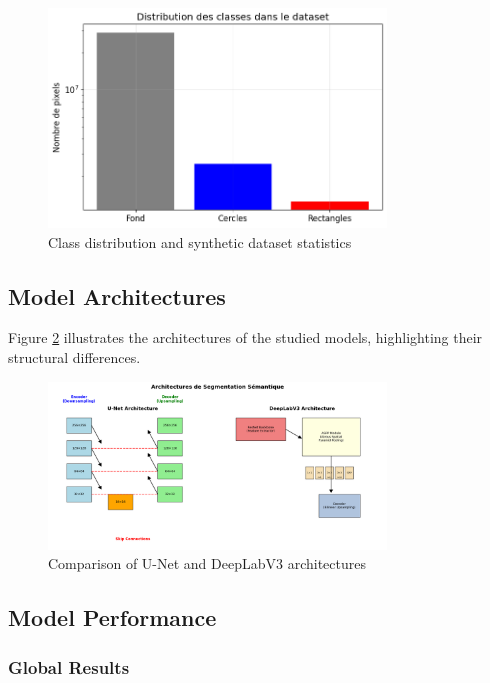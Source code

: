 \documentclass[12pt,a4paper]{article}
\begin{document}
\begin{figure}[H]
    \centering
    \includegraphics[width=0.8\textwidth]{img_tp1/cell_07_output_03_image_02.png}
    \caption{Class distribution and synthetic dataset statistics}
    \label{fig:dataset_distribution}
\end{figure}

\subsection{Model Architectures}

Figure \ref{fig:model_architectures} illustrates the architectures of the studied models, highlighting their structural differences.

\begin{figure}[H]
    \centering
    \includegraphics[width=0.8\textwidth]{img_tp1/cell_09_output_00_image_03.png}
    \caption{Comparison of U-Net and DeepLabV3 architectures}
    \label{fig:model_architectures}
\end{figure}

\subsection{Model Performance}

\subsubsection{Global Results}
\end{document}
